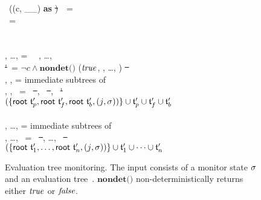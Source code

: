 \begin{figure}[t]
  \centering
  \begin{minipage}[t]{\linewidth}
    \linespread{1.2}
    \begin{minipage}[t]{.03\linewidth}
      \small
    \end{minipage}
    \begin{minipage}[t]{.95\linewidth}
      \small
      \algLet \monitor\ ((c, \_\!\_) \textbf{as} \st)\ \evt\ = \\
      \tabT \algLet \rt\ = \ \evt\ \algIn \\
      \tabT \algMatch \rt\ \algWith\\
      \tabT \algCase{\evj{\ectx}{\theFunction\ \expr[1]\ \dots\
          \expr[\theArity]}{\val}} \\
      \tabTT \algLet \val[1], \dots, \val[\theArity]  = 
      \ \ectx\ \expr[1], \dots,
      \tsf{eval}\ \ectx\ \expr[\theArity]\ \algIn \\
      \tabTT \algLet \st'\ = 
      \algIf $\neg c \land \textbf{nondet()}$ \algThen
      ($\ltrue$, \val[1], \dots, \val[\theArity])
      \algElse \st\ \algIn \\
      \tabTT \algLet \evt[p], \evt[f], \evt[b] = 
      immediate subtrees of \evt\ \algIn \\
      \tabTT \algLet \evtP[p], \evtP[f], \evtP[b]\ = 
      \monitor\ \st\ \evt[p], \monitor\ \st\ \evt[p], \monitor\ \st'\ \evt[b]\ \algIn\\
      \tabTT $(\setOf{\tsf{root}\ \evtP[p], 
        \tsf{root}\ \evtP[f], \tsf{root}\ \evtP[b], (\rt, \st))} 
      \cup \evtP[p] \cup \evtP[f] \cup \evtP[b]
      $ \\
      \tabT \algCase{\_\!\_} \\
      \tabTT \algLet \evt[1], \dots, \evt[n] = 
      immediate subtrees of \evt\ \algIn \\
      \tabTT \algLet \evtP[1], \dots, \evtP[n]\ = 
      \monitor\ \st\ \evt[1], \dots, \monitor\ \st\ \evt[n]\ \algIn\\
      \tabTT $(\setOf{\tsf{root}\ \evtP[1], \dots,
        \tsf{root}\ \evtP[n], (\rt, \st))} 
      \cup \evtP[1] \cup \dots \cup \evtP[n]
      $ 
   \end{minipage}
 \end{minipage}
 \caption{Evaluation tree monitoring.  The input consists of a
    monitor state $\st$ and an evaluation tree~\evt.
    $\textbf{nondet()}$ non-deterministically returns either $\ltrue$
    or $\lfalse$.
  }
  \label{fig-monitor-alg}
\end{figure}

